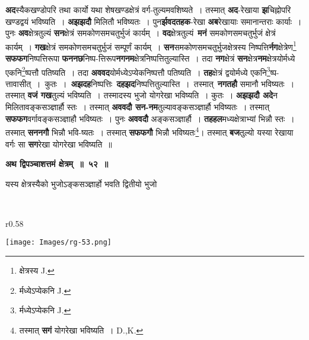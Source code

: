 \documentclass[11pt, openany]{book}
\begin{document}
\textbf{अद}स्यैकखण्डोपरि तथा कार्यो यथा शेषखण्डक्षेत्रं वर्ग-तुल्यमवशिष्यते~। तस्मात् \textbf{अद}-रेखाया \textbf{झ}चिह्नोपरि खण्डद्वयं भविष्यति~। \textbf{अझझदौ} मिलितौ भविष्यतः~। पुन\textbf{र्झवदतहक}-रेखा \textbf{अब}रेखायाः समानान्तराः कार्याः~। पुनः \textbf{अव}क्षेत्रतुल्यं \textbf{सन}क्षेत्रं समकोणसमचतुर्भुजं कार्यम्~। \textbf{वद}क्षेत्रतुल्यं~\textbf{मनं} समकोणसमचतुर्भुजं क्षेत्रं कार्यम्~। \textbf{गख}क्षेत्रं समकोणसमचतुर्भुजं सम्पूर्णं कार्यम्~। \textbf{सन}समकोणसमचतुर्भुजक्षेत्रस्य निष्पत्ति\textbf{र्नग}क्षेत्रेण\renewcommand{\thefootnote}{१}\footnote{क्षेत्रस्य {\en J.}} \textbf{सफफग}निष्पत्तिरूपा \textbf{फननछ}निष्प-त्तिरूप\textbf{नगनम}क्षेत्रनिष्पत्तितुल्यास्ति~। तदा \textbf{नग}क्षेत्रं \textbf{सन}क्षेत्र\textbf{नम}क्षेत्रयोर्मध्ये एकनि\renewcommand{\thefootnote}{२}\footnote{र्मध्येऽप्येकनि {\en J.}}ष्पत्तौ पतिष्यति~। तदा \textbf{अववद}योर्मध्येऽप्येकनिष्पत्तौ पतिष्यति~। \textbf{तह}क्षेत्रं द्वयोर्मध्ये एकनि\renewcommand{\thefootnote}{३}\footnote{र्मध्येऽप्येकनि {\en J.}}ष्प-त्तावासीत्~। \,कुतः~। \,\textbf{अझदह}निष्पत्तिः \,\textbf{दहझद}निष्पत्तितुल्यास्ति~। \,तस्मात् \,\textbf{नगतहौ} समानौ भविष्यतः~। तस्मात् \textbf{वजं गख}तुल्यं भविष्यति~। तस्मादस्य भुजो योगरेखा भविष्यति~। कुतः~। \textbf{अझझदौ अदे}न मिलितावङ्कसञ्ज्ञार्हौ स्तः~। तस्मात् \textbf{अववदौ सन-नम}तुल्यावङ्कसञ्ज्ञार्हौ भविष्यतः~। तस्मात् \textbf{सफफग}वर्गावङ्कसञ्ज्ञाहौ भविष्यतः~। पुनः \textbf{अववदौ} अङ्कसञ्ज्ञार्हौ~। \textbf{तहहल}मध्यक्षेत्राभ्यां भिन्नौ स्तः~। तस्मात् \textbf{सननगौ} भिन्नौ भवि-ष्यतः~। तस्मात् \textbf{सफफगौ} भिन्नौ भविष्यतः\renewcommand{\thefootnote}{४}\footnote{तस्मात् \textbf{सगं} योगरेखा भविष्यति~। {\en D.,K.}}\;। तस्मात् \textbf{बज}तुल्यो यस्या रेखाया वर्गः सा \textbf{सग}रेखा योगरेखा भविष्यति~॥
\vspace{2mm}

\begin{center}
\textbf{\large अथ द्विपञ्चाशत्तमं क्षेत्रम्~॥~५२~॥}
\end{center}

{\ab यस्य क्षेत्रस्यैको भुजोऽङ्कसञ्ज्ञार्हो भवति द्वितीयो भुजो }

\newpage
{}\\

\begin{wrapfigure}{r}{0.58\textwidth}
\vspace{-10mm}
\begin{flushright}
\texttt{[image: Images/rg-53.png]}
\end{flushright}
\vspace{-8mm}
\end{wrapfigure}
\end{document}
